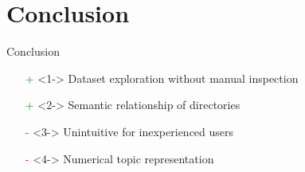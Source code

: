 \section{Conclusion}
\begin{frame}{Conclusion}
    \begin{itemize}
        \item[\textcolor{green}{+}]<1-> Dataset exploration without manual inspection
        \item[\textcolor{green}{+}]<2-> Semantic relationship of directories
        \item[\textcolor{red}{-}]<3-> Unintuitive for inexperienced users
        \item[\textcolor{red}{-}]<4-> Numerical topic representation
    \end{itemize}
    \vfill
\end{frame}
